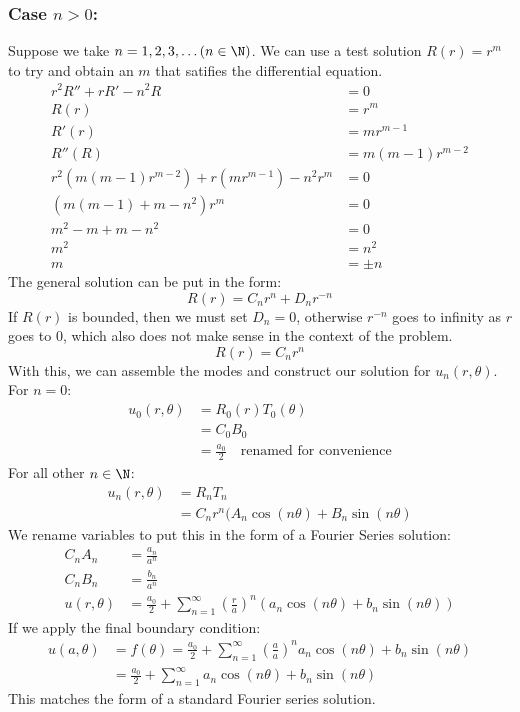 \documentclass{math}
\begin{document}
\subsubsection*{Case \( n > 0 \):}
Suppose we take \( n = 1,2,3,\dots (n\in\N) \). We can use a test solution
\( R(r) = r^m \) to try and obtain an \( m \) that satifies the differential
equation.
\begin{align*}
  r^2R''+rR'-n^2R &= 0 \\
  R(r) &= r^m \\
  R'(r) &= mr^{m-1} \\
  R''(R) &= m(m-1)r^{m-2} \\
  r^2(m(m-1)r^{m-2})+r(mr^{m-1})-n^2r^m &= 0 \\
  (m(m-1)+m-n^2)r^m &= 0 \\
  m^2-m+m-n^2 &= 0 \\
  m^2 &= n^2 \\
  m &= \pm n
\end{align*}
The general solution can be put in the form:
\[ R(r) = C_nr^n+D_nr^{-n} \]
If \( R(r) \) is bounded, then we must set \( D_n = 0 \), otherwise \( r^{-n} \)
goes to infinity as \( r \) goes to 0, which also does not make sense in the
context of the problem.
\[ R(r) = C_nr^n \]
With this, we can assemble the modes and construct our solution for
\( u_n(r,\theta) \). For \( n = 0 \):
\begin{align*}
  u_0(r,\theta) &= R_0(r)T_0(\theta) \\
  &= C_0B_0 \\
  &= \frac{a_0}{2} \quad \text{renamed for convenience}
\end{align*}
For all other \( n\in\N \):
\begin{align*}
  u_n(r,\theta) &= R_nT_n \\
  &= C_nr^n(A_n\cos(n\theta)+B_n\sin(n\theta)
\end{align*}
We rename variables to put this in the form of a Fourier Series solution:
\begin{align*}
  C_nA_n &= \frac{a_n}{a^n} \\
  C_nB_n &= \frac{b_n}{a^n} \\
  u(r,\theta) &= \frac{a_0}{2}+\sum_{n=1}^{\infty}(\frac{r}{a})^n
    (a_n\cos(n\theta)+b_n\sin(n\theta))
\end{align*}
If we apply the final boundary condition:
\begin{align*}
  u(a,\theta) &= f(\theta) =
    \frac{a_0}{2}+\sum_{n=1}^{\infty}(\frac{a}{a})^n
      a_n\cos(n\theta)+b_n\sin(n\theta) \\
  &= \frac{a_0}{2}+\sum_{n=1}^{\infty}a_n\cos(n\theta)+b_n\sin(n\theta)
\end{align*}
This matches the form of a standard Fourier series solution.
\end{document}
